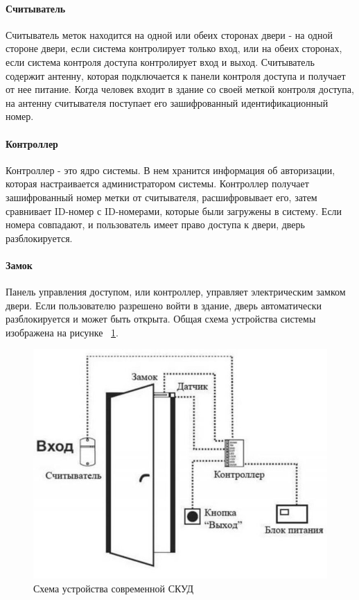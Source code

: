 \paragraph {Считыватель}

Считыватель меток находится на одной или обеих сторонах двери - на одной стороне двери, если система контролирует только вход, или на обеих сторонах, если система контроля доступа контролирует вход и выход. Считыватель содержит антенну, которая подключается к панели контроля доступа и получает от нее питание.
Когда человек входит в здание со своей меткой контроля доступа, на антенну считывателя поступает его зашифрованный идентификационный номер.

\paragraph {Контроллер}

Контроллер - это ядро системы. В нем хранится информация об авторизации, которая настраивается администратором системы. Контроллер получает зашифрованный номер метки от считывателя, расшифровывает его, затем сравнивает ID-номер с ID-номерами, которые были загружены в систему. Если номера совпадают, и пользователь имеет право доступа к двери, дверь разблокируется.

\paragraph {Замок}

Панель управления доступом, или контроллер, управляет электрическим замком двери. Если пользователю разрешено войти в здание, дверь автоматически разблокируется и может быть открыта.
Общая схема устройства системы изображена на рисунке ~\ref{fig:commonscheme1}.
\begin{figure}
	\centering
	\includegraphics[width=0.7\linewidth]{images/CommonScheme1}
	\caption{Схема устройства современной СКУД}
	\label{fig:commonscheme1}
\end{figure}

